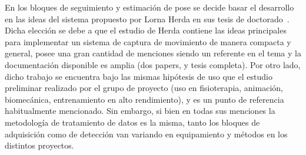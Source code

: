 En los bloques de seguimiento y estimación de pose se decide basar el desarrollo en las ideas del sistema propuesto por Lorna Herda en sus tesis de doctorado~\cite{herda}. Dicha elección se debe a que el estudio de Herda contiene las ideas principales para implementar un sistema de captura de movimiento de manera compacta y general, posee una gran cantidad de menciones siendo un referente en el tema y la documentación disponible es amplia (dos papers, y tesis completa). Por otro lado, dicho trabajo se encuentra bajo las mismas hipótesis de uso que el estudio preliminar realizado por el grupo de proyecto (uso en fisioterapia, animación, biomecánica, entrenamiento en alto rendimiento), y es un punto de referencia habitualmente mencionado. Sin embargo, si bien en todas sus menciones la metodología de tratamiento de datos es la misma, tanto los bloques de adquisición como de detección van variando en equipamiento y métodos en los distintos proyectos.